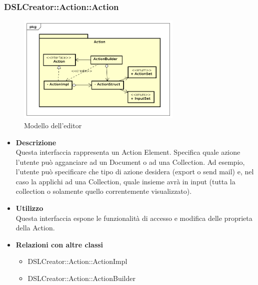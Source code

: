  \subsubsection{DSLCreator::Action::Action}
                 \begin{figure}[H]
                  \centering
                  \includegraphics[width=0.7\textwidth]{res/img/Action.png}
                  \caption{Modello dell'editor}
                  \label{fig:diagram_model}
                \end{figure}
                    \begin{itemize}
                        \item \textbf{Descrizione} \hfill \\
                          Questa interfaccia rappresenta un Action Element. Specifica quale azione l'utente può agganciare ad un Document o ad una Collection. Ad esempio, l'utente può specificare che tipo di azione desidera (export o send mail) e, nel caso la applichi ad una Collection, quale insieme avrà in input (tutta la collection o solamente quello correntemente visualizzato).
                        \item \textbf{Utilizzo} \hfill \\
                          Questa interfaccia espone le funzionalità di accesso e modifica delle proprieta della Action.
                        \item \textbf{Relazioni con altre classi}
                            \begin{itemize}
                              \item DSLCreator::Action::ActionImpl
                              \item DSLCreator::Action::ActionBuilder
                            \end{itemize}
                    \end{itemize}  

